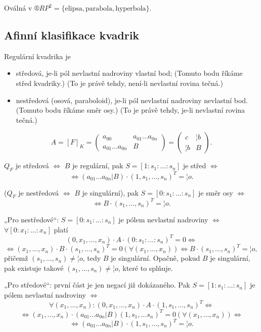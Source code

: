 \documentclass[12pt]{article}					%
\begin{document}
\begin{poznamka}
	Oválná v $®RP^2 = \{\text{elipsa}, \text{parabola}, \text{hyperbola}\}$.
\end{poznamka}

\subsection{Afinní klasifikace kvadrik}
\begin{definice}
	Regulární kvadrika je
	\begin{itemize}
		\item středová, je-li pól nevlastní nadroviny vlastní bod; (Tomuto bodu říkáme střed kvadriky.) (To je právě tehdy, není-li nevlastní rovina tečná.)
		\item nestředová (osová, paraboloid), je-li pól nevlastní nadroviny nevlastní bod. (Tomuto bodu říkáme směr osy.) (To je právě tehdy, je-li nevlastní rovina tečná.)
	\end{itemize}
\end{definice}

\begin{definice}[Značení]
	$$ A = [F]_K = \begin{pmatrix} a_{00} & a_{01} … a_{0n} \\ a_{01} … a_{0n} & B \end{pmatrix} = \begin{pmatrix} c & ¦b \\ ¦b & B \end{pmatrix}. $$
\end{definice}

\begin{veta}
	$Q_F$ je středová $\Leftrightarrow$ $B$ je regulární, pak $S = [1:s_1:…:s_n]$ je střed $\Leftrightarrow$
	$$ \Leftrightarrow (a_{01} … a_{0n} | B)·(1, s_1, …, s_n)^T = ¦o. $$

	($Q_F$ je nestředová $\Leftrightarrow$ $B$ je singulární), pak $S = [0:s_1:…:s_n]$ je směr osy $\Leftrightarrow$
	$$ \Leftrightarrow B·(s_1, …, s_n)^T = ¦o. $$

	\begin{dukazin}
		„Pro nestředové“: $S = [0:s_1:…:s_n]$ je pólem nevlastní nadroviny $\Leftrightarrow$ $\forall [0:x_1:…:x_n]$ platí
		$$ (0, x_1, …, x_n)·A·(0:s_1:…:s_n)^T = 0 \Leftrightarrow $$
		$$ \Leftrightarrow (x_1, …, x_n)·B·(s_1, …, s_n)^T = 0 (\forall (x_1, …, x_n)) \Leftrightarrow B·(s_1, …, s_n)^T = ¦o, $$
		přičemž $(s_1, …, s_n) ≠ ¦o$, tedy $B$ je singulární. Opačně, pokud $B$ je singulární, pak existuje takové $(s_1, …, s_n) ≠ ¦o$, které to splňuje.

		„Pro středové“: první část je jen negací již dokázaného. Pak $S = [1:s_1: …: s_n]$ je pólem nevlastní nadroviny $\Leftrightarrow$
		$$ \forall (x_1, …, x_n): (0, x_1, …, x_n)·A·(1, s_1, …, s_n)^T \Leftrightarrow $$
		$$ \Leftrightarrow (x_1, …, x_n)·(a_{01} … a_{0n} | B) (1, s_1, … s_n)^T = 0 (\forall (x_1, …, x_n)) \Leftrightarrow $$
		$$ \Leftrightarrow (a_{01} … a_{0n} | B)·(1, s_1, …, s_n)^T = ¦o. $$
	\end{dukazin}
\end{veta}
\end{document}

